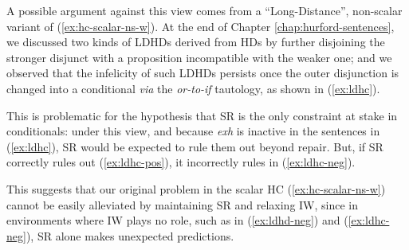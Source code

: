 	A possible argument against this view comes from a ``Long-Distance'', non-scalar variant of (\ref{ex:hc-scalar-ns-w}). At the end of Chapter \ref{chap:hurford-sentences}, we discussed two kinds of LDHDs derived from HDs by further disjoining the stronger disjunct with a proposition incompatible with the weaker one; and we observed that the infelicity of such LDHDs persists once the outer disjunction is changed into a conditional \textit{via} the \textit{or-to-if} tautology, as shown in (\ref{ex:ldhc}).
	
	This is problematic for the hypothesis that SR is the only constraint at stake in conditionals: under this view, and because \textit{exh} is inactive in the sentences in (\ref{ex:ldhc}), SR would be expected to rule them out beyond repair. But, if SR correctly rules out (\ref{ex:ldhc-pos}), it incorrectly rules in (\ref{ex:ldhc-neg}).
	
	\begin{exe}
		\ex \label{ex:ldhc}
		\begin{xlist}
			\label{ex:ldhc-pos}
			\label{ex:ldhc-neg}
		\end{xlist}
	\end{exe}
	
	This suggests that our original problem in the scalar HC (\ref{ex:hc-scalar-ns-w}) cannot be easily alleviated by maintaining SR and relaxing IW, since in environments where IW plays no role, such as in (\ref{ex:ldhd-neg}) and (\ref{ex:ldhc-neg}), SR alone makes unexpected predictions.
	
	
	
	
	
